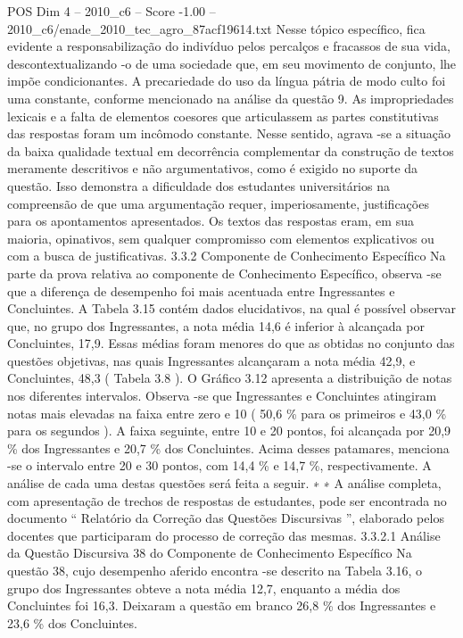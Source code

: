 \begin{textsample}{POS Dim 4 – 2010\_c6 – Score -1.00 – 2010\_c6/enade\_2010\_tec\_agro\_87acf19614.txt}
Nesse tópico específico, fica evidente a responsabilização do indivíduo pelos percalços e fracassos de sua vida, descontextualizando -o de uma sociedade que, em seu movimento de conjunto, lhe impõe condicionantes.
A precariedade do uso da língua pátria de modo culto foi uma constante, conforme mencionado na análise da questão 9.
As impropriedades lexicais e a falta de elementos coesores que articulassem as partes constitutivas das respostas foram um incômodo constante.
Nesse sentido, agrava -se a situação da baixa qualidade textual em decorrência complementar da construção de textos meramente descritivos e não argumentativos, como é exigido no suporte da questão.
Isso demonstra a dificuldade dos estudantes universitários na compreensão de que uma argumentação requer, imperiosamente, justificações para os apontamentos apresentados.
Os textos das respostas eram, em sua maioria, opinativos, sem qualquer compromisso com elementos explicativos ou com a busca de justificativas. 3.3.2 Componente de Conhecimento Específico Na parte da prova relativa ao componente de Conhecimento Específico, observa -se que a diferença de desempenho foi mais acentuada entre Ingressantes e Concluintes.
A Tabela 3.15 contém dados elucidativos, na qual é possível observar que, no grupo dos Ingressantes, a nota média 14,6 é inferior à alcançada por Concluintes, 17,9.
Essas médias foram menores do que as obtidas no conjunto das questões objetivas, nas quais Ingressantes alcançaram a nota média 42,9, e Concluintes, 48,3 ( Tabela 3.8 ).
O Gráfico 3.12 apresenta a distribuição de notas nos diferentes intervalos.
Observa -se que Ingressantes e Concluintes atingiram notas mais elevadas na faixa entre zero e 10 ( 50,6 \% para os primeiros e 43,0 \% para os segundos ).
A faixa seguinte, entre 10 e 20 pontos, foi alcançada por 20,9 \% dos Ingressantes e 20,7 \% dos Concluintes.
Acima desses patamares, menciona -se o intervalo entre 20 e 30 pontos, com 14,4 \% e 14,7 \%, respectivamente.
A análise de cada uma destas questões será feita a seguir. ∗ ∗ A análise completa, com apresentação de trechos de respostas de estudantes, pode ser encontrada no documento “ Relatório da Correção das Questões Discursivas ”, elaborado pelos docentes que participaram do processo de correção das mesmas. 3.3.2.1 Análise da Questão Discursiva 38 do Componente de Conhecimento Específico Na questão 38, cujo desempenho aferido encontra -se descrito na Tabela 3.16, o grupo dos Ingressantes obteve a nota média 12,7, enquanto a média dos Concluintes foi 16,3.
Deixaram a questão em branco 26,8 \% dos Ingressantes e 23,6 \% dos Concluintes.

\end{textsample}
